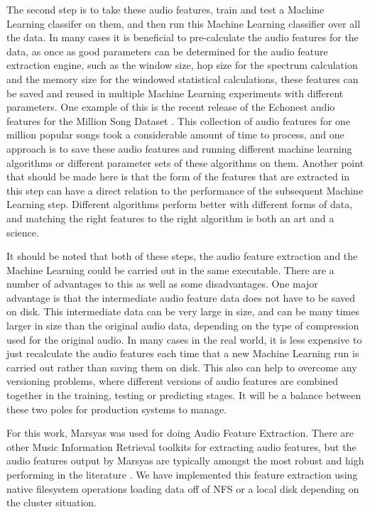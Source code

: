 \documentclass[12pt,oneside]{book}
\begin{document}
The second step is to take these audio features, train and test a
Machine Learning classifer on them, and then run this Machine Learning
classifier over all the data.  In many cases it is beneficial to
pre-calculate the audio features for the data, as once as good
parameters can be determined for the audio feature extraction engine,
such as the window size, hop size for the spectrum calculation and the
memory size for the windowed statistical calculations, these features
can be saved and reused in multiple Machine Learning experiments with
different parameters.  One example of this is the recent release of
the Echonest audio features for the Million Song Dataset
\cite{bertinmahieux11}.  This collection of audio features for one
million popular songs took a considerable amount of time to process,
and one approach is to save these audio features and running different
machine learning algorithms or different parameter sets of these
algorithms on them.  Another point that should be made here is that
the form of the features that are extracted in this step can have a
direct relation to the performance of the subsequent Machine Learning
step.  Different algorithms perform better with different forms of
data, and matching the right features to the right algorithm is both
an art and a science.

It should be noted that both of these steps, the audio feature
extraction and the Machine Learning could be carried out in the same
executable.  There are a number of advantages to this as well as some
disadvantages.  One major advantage is that the intermediate audio
feature data does not have to be saved on disk.  This intermediate
data can be very large in size, and can be many times larger in size
than the original audio data, depending on the type of compression
used for the original audio.  In many cases in the real world, it is
less expensive to just recalculate the audio features each time that a
new Machine Learning run is carried out rather than saving them on
disk.  This also can help to overcome any versioning problems, where
different versions of audio features are combined together in the
training, testing or predicting stages.  It will be a balance between
these two poles for production systems to manage.

For this work, Marsyas was used for doing Audio Feature Extraction.
There are other Music Information Retrieval toolkits for extracting
audio features, but the audio features output by Marsyas are typically
amongst the most robust and high performing in the literature
\cite{marsyas}.  We have implemented this feature extraction using
native filesystem operations loading data off of NFS or a local disk
depending on the cluster situation.
\end{document}

